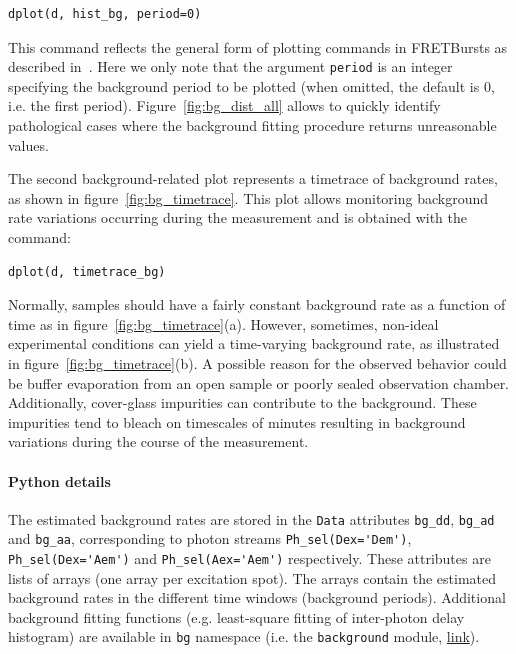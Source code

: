 \documentclass[10pt,letterpaper]{article}
\begin{document}
\begin{lstlisting}
dplot(d, hist_bg, period=0)
\end{lstlisting}

This command reflects the general form of plotting commands in FRETBursts
as described in~. %
Here we only note that the argument \verb|period| is an integer specifying the background
period to be plotted (when omitted, the default is 0, i.e. the first period).
Figure~\ref{fig:bg_dist_all} allows to quickly identify pathological cases where the
background fitting procedure returns unreasonable values.

The second background-related plot represents a timetrace of background rates,
as shown in figure~\ref{fig:bg_timetrace}. This plot allows monitoring background rate variations
occurring during the measurement and is obtained with the command:

\begin{lstlisting}
dplot(d, timetrace_bg)
\end{lstlisting}

Normally, samples should have a fairly constant background rate as a function of time
as in figure~\ref{fig:bg_timetrace}(a). However, sometimes, non-ideal
experimental conditions can yield a time-varying background rate, as illustrated in
figure~\ref{fig:bg_timetrace}(b).
A possible reason for the observed behavior could be buffer evaporation from an open sample
or poorly sealed observation chamber. Additionally,
cover-glass impurities can contribute to the background.
These impurities tend to bleach on timescales of minutes resulting in
background variations during the course of the measurement.

\paragraph*{Python details}

The estimated background rates are stored in the \verb|Data| attributes
\verb|bg_dd|, \verb|bg_ad| and \verb|bg_aa|, corresponding to photon
streams \verb|Ph_sel(Dex='Dem')|, \verb|Ph_sel(Dex='Aem')| and \verb|Ph_sel(Aex='Aem')|
respectively.
These attributes are lists of arrays (one array per excitation spot).
The arrays contain the estimated background rates in the different time windows
(background periods).
Additional background fitting functions (e.g. least-square fitting of inter-photon delay
histogram) are available in \verb|bg| namespace
(i.e. the \verb|background| module,
\href{http://fretbursts.readthedocs.org/en/latest/background.html}{link}).
\end{document}
